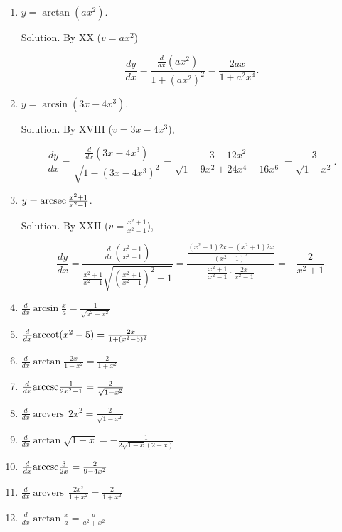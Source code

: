 \begin{enumerate}
\item
$y = \arctan (ax^2)$.

Solution. By XX ($v = ax^2$)

\[
\frac{dy}{dx} 	= \frac{\frac{d}{dx} (ax^2)}{1 + (ax^2)^2} 
  	= \frac{2ax}{1 + a^2x^4}.
\]

\item
$y = \arcsin(3x - 4x^3)$.

Solution. By XVIII ($v = 3x - 4x^3$),

\[	
\frac{dy}{dx} =	\frac{\frac{d}{dx}(3x - 4x^3)}{\sqrt{1 - (3x - 4x^3)^2}}
=\frac{3 - 12x^2}{\sqrt{1 - 9x^2 + 24x^4 - 16x^6}} = \frac{3}{\sqrt{1 - x^2}}.
\]

\item
$y={\rm arcsec}\, \frac{x^2 + 1}{x^2 - 1}$.

Solution. By XXII ($v =  \frac{x^2 + 1}{x^2 - 1} $),	

\[
\frac{dy}{dx} 	
= \frac{\frac{d}{dx} \left ( \frac{x^2 + 1}{x^2 - 1} \right )}{\frac{x^2 + 1}{x^2 - 1} \sqrt{\left ( \frac{x^2 + 1}{x^2 - 1} \right )^2 - 1}} 	
= \frac{\frac{(x^2 - 1)2x - (x^2 + 1)2x}{(x^2 - 1)^2}}{\frac{x^2 + 1}{x^2 - 1} \cdot \frac{2x}{x^2 - 1}} 
= -\frac{2}{x^2 + 1}.
\]

\item
$\frac{d}{dx} \arcsin \frac{x}{a} = \frac{1}{\sqrt{a^2 - x^2}}$

\item
$\frac{d}{dx} {\rm arccot} (x^2 - 5) = \frac{-2x}{1 + (x^2 - 5)^2}$

\item
$\frac{d}{dx} \arctan \frac{2x}{1 - x^2} = \frac{2}{1 + x^2}$

\item
$\frac{d}{dx} {\rm arccsc} \frac{1}{2x^2 - 1} = \frac{2}{\sqrt{1 - x^2}}$

\item
$\frac{d}{dx} \operatorname{arcvers}\, 2x^2 = \frac{2}{\sqrt{1 - x^2}}$

\item
$\frac{d}{dx} \arctan \sqrt{1 - x} = -\frac{1}{2 \sqrt{1 - x} (2 - x)}$

\item
$\frac{d}{dx} {\rm arccsc} \frac{3}{2x} = \frac{2}{9 - 4x^2}$

\item
$\frac{d}{dx} \operatorname{arcvers}\, \frac{2x^2}{1 + x^2} = \frac{2}{1 + x^2}$

\item
$\frac{d}{dx} \arctan \frac{x}{a} = \frac{a}{a^2 + x^2}$


\end{enumerate}
